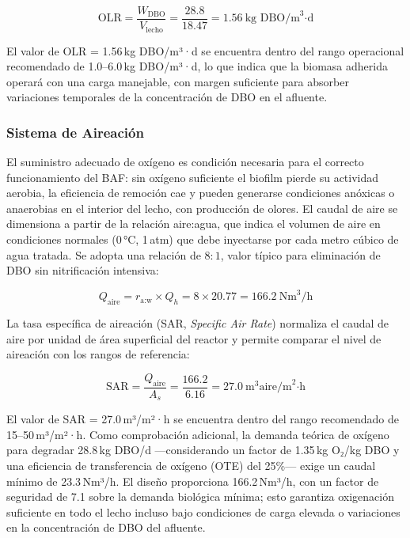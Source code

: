 \documentclass[12pt,a4paper]{article}
\begin{document}
\begin{equation}
\text{OLR} = \frac{W_{\text{DBO}}}{V_{\text{lecho}}} = \frac{28.8}{18.47} = 1.56\ \text{kg DBO/m}^3\text{·d}
\end{equation}

El valor de OLR = 1.56\,kg DBO/m³·d se encuentra dentro del rango operacional recomendado de 1.0--6.0\,kg DBO/m³·d, lo que indica que la biomasa adherida operará con una carga manejable, con margen suficiente para absorber variaciones temporales de la concentración de DBO en el afluente.

\subsubsection*{Sistema de Aireación}

El suministro adecuado de oxígeno es condición necesaria para el correcto funcionamiento del BAF: sin oxígeno suficiente el biofilm pierde su actividad aerobia, la eficiencia de remoción cae y pueden generarse condiciones anóxicas o anaerobias en el interior del lecho, con producción de olores. El caudal de aire se dimensiona a partir de la relación aire:agua, que indica el volumen de aire en condiciones normales (0\,°C, 1\,atm) que debe inyectarse por cada metro cúbico de agua tratada. Se adopta una relación de $8:1$, valor típico para eliminación de DBO sin nitrificación intensiva:

\begin{equation}
Q_{\text{aire}} = r_{\text{a:w}} \times Q_{h} = 8 \times 20.77 = 166.2\ \text{Nm}^3\text{/h}
\end{equation}

La tasa específica de aireación (SAR, \textit{Specific Air Rate}) normaliza el caudal de aire por unidad de área superficial del reactor y permite comparar el nivel de aireación con los rangos de referencia:

\begin{equation}
\text{SAR} = \frac{Q_{\text{aire}}}{A_{s}} = \frac{166.2}{6.16} = 27.0\ \text{m}^3\text{aire/m}^2\text{·h}
\end{equation}

El valor de SAR = 27.0\,m³/m²·h se encuentra dentro del rango recomendado de 15--50\,m³/m²·h. Como comprobación adicional, la demanda teórica de oxígeno para degradar 28.8\,kg DBO/d —considerando un factor de 1.35\,kg O₂/kg DBO y una eficiencia de transferencia de oxígeno (OTE) del 25\%— exige un caudal mínimo de 23.3\,Nm³/h. El diseño proporciona 166.2\,Nm³/h, con un factor de seguridad de 7.1 sobre la demanda biológica mínima; esto garantiza oxigenación suficiente en todo el lecho incluso bajo condiciones de carga elevada o variaciones en la concentración de DBO del afluente.
\end{document}
